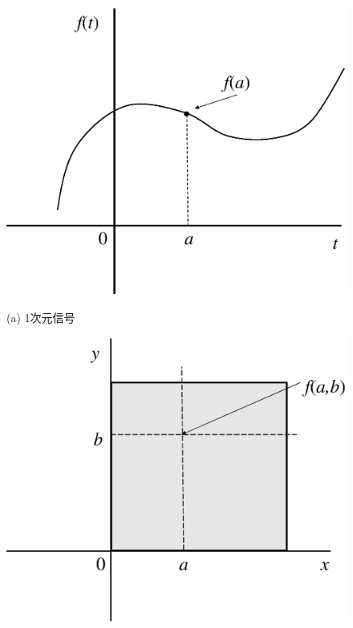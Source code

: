 \begin{figure}[H]
\begin{center}
\begin{minipage}{.35\textwidth}
\begin{center}
\includegraphics[width=.98\textwidth]{fig/zu-7-2-a.eps}

(a) 1次元信号
\end{center}
\end{minipage}
\begin{minipage}{.35\textwidth}
\begin{center}
\includegraphics[width=.98\textwidth]{fig/zu-7-2-b.eps}


\end{center}
\end{minipage}
\end{center}
\end{figure}

